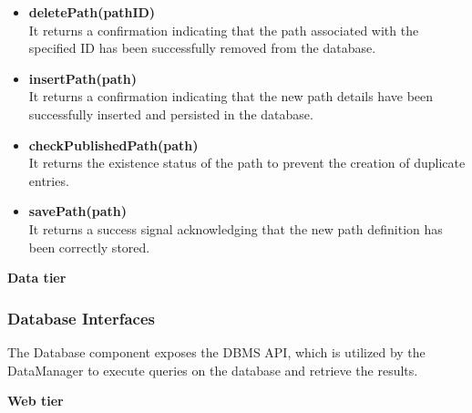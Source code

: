 \begin{itemize}
    \item \textbf{deletePath(pathID)}\\
    It returns a confirmation indicating that the path associated with the specified ID has been successfully removed from the database.
    \item \textbf{insertPath(path)}\\
    It returns a confirmation indicating that the new path details have been successfully inserted and persisted in the database.
    \item \textbf{checkPublishedPath(path)}\\
    It returns the existence status of the path to prevent the creation of duplicate entries.
    \item \textbf{savePath(path)}\\
    It returns a success signal acknowledging that the new path definition has been correctly stored.
\end{itemize}

\newpage
\vspace{5mm}
\noindent
\textbf{Data tier}

\subsubsection{Database Interfaces}
The Database component exposes the DBMS API, which is utilized by the DataManager to execute queries on the database and retrieve the results.


\vspace{5mm}
\noindent
\textbf{Web tier}

